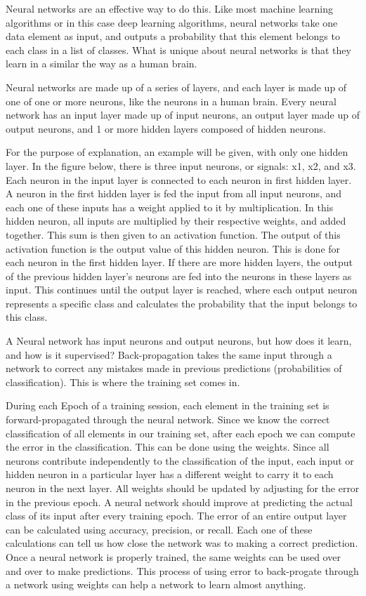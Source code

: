 \documentclass[12pt]{article} %
\begin{document}
	Neural networks are an effective way to do this. Like most machine learning algorithms or in this case deep learning algorithms, neural networks take one data element as input, and outputs a probability that this element belongs to each class in a list of classes. What is unique about neural networks is that they learn in a similar the way as a human brain. 

	Neural networks are made up of a series of layers, and each layer is made up of one of one or more neurons, like the neurons in a human brain. Every neural network has an input layer made up of input neurons, an output layer made up of output neurons, and 1 or more hidden layers composed of hidden neurons. 

	For the purpose of explanation, an example will be given, with only one hidden layer. In the figure below, there is three input neurons, or signals: x1, x2, and x3. Each neuron in the input layer is connected to each neuron in first hidden layer. A neuron in the first hidden layer is fed the input from all input neurons, and each one of these inputs has a weight applied to it by multiplication. In this hidden neuron, all inputs are multiplied by their respective weights, and added together. This sum is then given to an activation function. The output of this activation function is the output value of this hidden neuron. This is done for each neuron in the first hidden layer. If there are more hidden layers, the output of the previous hidden layer's neurons are fed into the neurons in these layers as input. This continues until the output layer is reached, where each output neuron represents a specific class and calculates the probability that the input belongs to this class.\cite{KubatMachineLearn}
	
 	A Neural network has input neurons and output neurons, but how does it learn, and how is it supervised? Back-propagation takes the same input through a network to correct any mistakes made in previous predictions (probabilities of classification). This is where the training set comes in. 

	During each Epoch of a training session, each element in the training set is forward-propagated through the neural network. Since we know the correct classification of all elements in our training set, after each epoch we can compute the error in the classification. This can be done using the weights. Since all neurons contribute independently to the classification of the input, each input or hidden neuron in a particular layer has a different weight to carry it to each neuron in the next layer. All weights should be updated by adjusting for the error in the previous epoch. A neural network should improve at predicting the actual class of its input after every training epoch. The error of an entire output layer can be calculated using accuracy, precision, or recall. Each one of these calculations can tell us how close the network was to making a correct prediction. Once a neural network is properly trained, the same weights can be used over and over to make predictions. This process of using error to back-progate through a network using weights can help a network to learn almost anything.\cite{KubatMachineLearn} 
	
\end{document}
